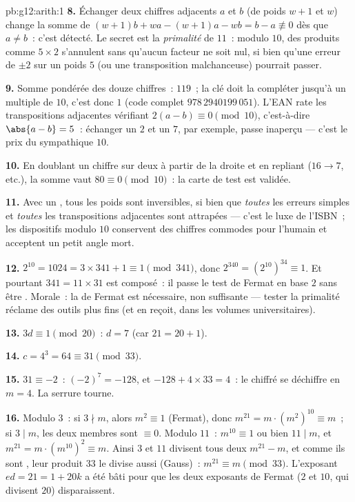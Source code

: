\begin{solution}{pb:g12:arith:1}
\textbf{8.} Échanger deux chiffres adjacents $a$ et $b$ (de poids
$w + 1$ et $w$) change la somme de
$(w+1)b + wa - (w+1)a - wb = b - a \not\equiv 0$ dès que
$a \neq b$~: c'est détecté. Le secret est la \emph{primalité} de
$11$~: modulo $10$, des produits comme $5 \times 2$ s'annulent sans
qu'aucun facteur ne soit nul, si bien qu'une erreur de $\pm 2$ sur
un poids $5$ (ou une transposition malchanceuse) pourrait passer.

\textbf{9.} Somme pondérée des douze chiffres~: $119$~; la clé
doit la compléter jusqu'à un multiple de $10$, c'est donc $1$ (code
complet $978\,2940199\,051$). L'EAN rate les transpositions
adjacentes vérifiant $2(a - b) \equiv 0 \pmod{10}$, c'est-à-dire
$\abs{a - b} = 5$~: échanger un $2$ et un $7$, par exemple, passe
inaperçu --- c'est le prix du sympathique  $10$.

\textbf{10.} En doublant un chiffre sur deux à partir de la droite
et en repliant ($16 \to 7$, etc.), la somme vaut $80 \equiv 0
\pmod{10}$~: la carte de test est validée.

\textbf{11.} Avec un  , tous les poids sont
inversibles, si bien que \emph{toutes} les erreurs simples et
\emph{toutes} les transpositions adjacentes sont attrapées ---
c'est le luxe de l'ISBN~; les dispositifs modulo $10$ conservent
des chiffres commodes pour l'humain et acceptent un petit angle
mort.

\textbf{12.} $2^{10} = 1024 = 3 \times 341 + 1 \equiv 1
\pmod{341}$, donc $2^{340} = \left(2^{10}\right)^{34} \equiv 1$. Et
pourtant $341 = 11 \times 31$ est composé~: il passe le test de
Fermat en base $2$ sans être . Morale~: la  de
Fermat est nécessaire, non suffisante --- tester la primalité
réclame des outils plus fins (et en reçoit, dans les volumes
universitaires).

\textbf{13.} $3d \equiv 1 \pmod{20}$~: $d = 7$ (car
$21 = 20 + 1$).

\textbf{14.} $c = 4^3 = 64 \equiv 31 \pmod{33}$.

\textbf{15.} $31 \equiv -2$~: $(-2)^7 = -128$, et
$-128 + 4 \times 33 = 4$~: le chiffré se déchiffre en $m = 4$. La
serrure tourne.

\textbf{16.} Modulo $3$~: si $3 \nmid m$, alors $m^2 \equiv 1$
(Fermat), donc $m^{21} = m \cdot \left(m^2\right)^{10} \equiv m$~;
si $3 \mid m$, les deux membres sont $\equiv 0$. Modulo $11$~:
$m^{10} \equiv 1$ ou bien $11 \mid m$, et
$m^{21} = m \cdot \left(m^{10}\right)^2 \equiv m$. Ainsi $3$ et
$11$ divisent tous deux $m^{21} - m$, et comme ils sont , leur produit $33$ le divise aussi (Gauss)~:
$m^{21} \equiv m \pmod{33}$. L'exposant $ed = 21 = 1 + 20k$ a été
bâti pour que les deux exposants de Fermat ($2$ et $10$, qui
divisent $20$) disparaissent.


\end{solution}
